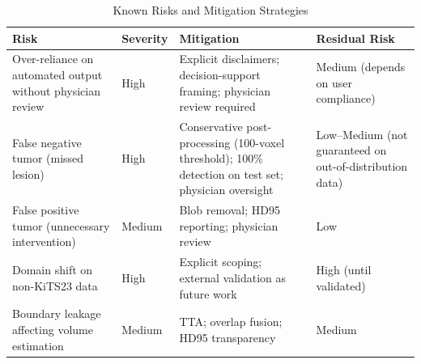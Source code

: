 
\begin{table}[!t]
\caption{Known Risks and Mitigation Strategies}
\label{tab:risk_mitigation}
\centering
\begin{tabular}{@{}p{3.5cm}p{3cm}p{3.5cm}p{3cm}@{}}
\toprule
\textbf{Risk} & \textbf{Severity} & \textbf{Mitigation} & \textbf{Residual Risk} \\
\midrule
Over-reliance on automated output without physician review & High & Explicit disclaimers; decision-support framing; physician review required & Medium (depends on user compliance) \\
False negative tumor (missed lesion) & High & Conservative post-processing (100-voxel threshold); 100\% detection on test set; physician oversight & Low--Medium (not guaranteed on out-of-distribution data) \\
False positive tumor (unnecessary intervention) & Medium & Blob removal; HD95 reporting; physician review & Low \\
Domain shift on non-KiTS23 data & High & Explicit scoping; external validation as future work & High (until validated) \\
Boundary leakage affecting volume estimation & Medium & TTA; overlap fusion; HD95 transparency & Medium \\
\bottomrule
\end{tabular}
\end{table}
